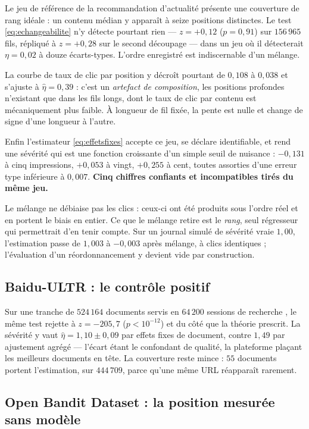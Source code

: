 \documentclass[11pt,a4paper]{article}
\begin{document}
Le jeu de référence de la recommandation d'actualité \citep{wu2020} présente une couverture
de rang idéale : un contenu médian y apparaît à seize positions distinctes. Le test
\eqref{eq:echangeabilite} n'y détecte pourtant rien --- $z = +0{,}12$ ($p = 0{,}91$) sur
$156\,965$ fils, répliqué à $z = +0{,}28$ sur le second découpage --- dans un jeu où il
détecterait $\eta = 0{,}02$ à douze écarts-types. L'ordre enregistré est indiscernable d'un
mélange.

La courbe de taux de clic par position y décroît pourtant de $0{,}108$ à $0{,}038$ et
s'ajuste à $\hat\eta = 0{,}39$ : c'est un \emph{artefact de composition}, les positions
profondes n'existant que dans les fils longs, dont le taux de clic par contenu est
mécaniquement plus faible. À longueur de fil fixée, la pente est nulle et change de signe
d'une longueur à l'autre.

Enfin l'estimateur \eqref{eq:effetsfixes} accepte ce jeu, se déclare identifiable, et rend
une sévérité qui est une fonction croissante d'un simple seuil de nuisance : $-0{,}131$ à
cinq impressions, $+0{,}053$ à vingt, $+0{,}255$ à cent, toutes assorties d'une erreur type
inférieure à $0{,}007$. \textbf{Cinq chiffres confiants et incompatibles tirés du même jeu.}

Le mélange ne débiaise pas les clics : ceux-ci ont été produits sous l'ordre réel et en
portent le biais en entier. Ce que le mélange retire est le \emph{rang}, seul régresseur qui
permettrait d'en tenir compte. Sur un journal simulé de sévérité vraie $1{,}00$, l'estimation
passe de $1{,}003$ à $-0{,}003$ après mélange, à clics identiques ; l'évaluation d'un
réordonnancement y devient vide par construction.

\subsection{Baidu-ULTR : le contrôle positif}

Sur une tranche de $524\,164$ documents servis en $64\,200$ sessions de recherche
\citep{zou2022}, le même test rejette à $z = -205{,}7$ ($p < 10^{-12}$) et du côté que la
théorie prescrit. La sévérité y vaut $\hat\eta = 1{,}10 \pm 0{,}09$ par effets fixes de
document, contre $1{,}49$ par ajustement agrégé --- l'écart étant le confondant de qualité,
la plateforme plaçant les meilleurs documents en tête. La couverture reste mince : $55$
documents portent l'estimation, sur $444\,709$, parce qu'une même URL réapparaît rarement.

\subsection{Open Bandit Dataset : la position mesurée sans modèle}
\end{document}
